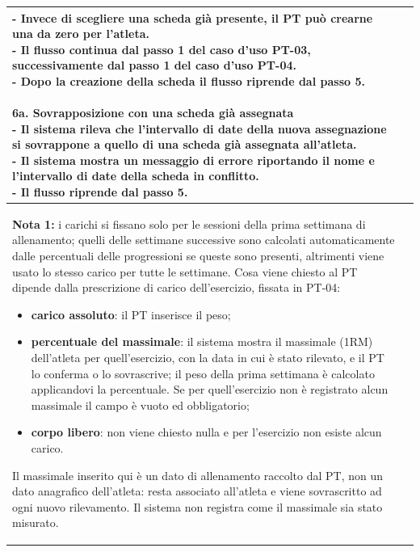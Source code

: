\documentclass[../../../../SoftwareRequirementsSpecification.tex]{subfiles}
\begin{document}
\begin{tabularx}{\textwidth}{|l|X|}
{    - Invece di scegliere una scheda già presente, il PT può crearne
    una da zero per l'atleta. \newline
    - Il flusso continua dal passo 1 del caso d'uso PT-03,
    successivamente dal passo 1 del caso d'uso PT-04. \newline
    - Dopo la creazione della scheda il flusso riprende dal
    passo 5. \newline
    \newline
    \textbf{6a. Sovrapposizione con una scheda già assegnata} \newline
    - Il sistema rileva che l'intervallo di date della nuova
    assegnazione si sovrappone a quello di una scheda già assegnata
    all'atleta. \newline
    - Il sistema mostra un messaggio di errore riportando il nome e
    l'intervallo di date della scheda in conflitto. \newline
    - Il flusso riprende dal passo 5. \newline
  } \\ \hline
  \ucnote{
    \textbf{Nota 1:} i carichi si fissano solo per le sessioni della
    prima settimana di allenamento; quelli delle settimane successive
    sono calcolati automaticamente dalle percentuali delle
    progressioni se queste sono presenti, altrimenti viene usato lo
    stesso carico per tutte le settimane. Cosa viene chiesto al PT
    dipende dalla prescrizione di carico dell'esercizio, fissata in
    PT-04:
    \begin{itemize}
      \item \textbf{carico assoluto}: il PT inserisce il peso;
      \item \textbf{percentuale del massimale}: il sistema mostra il
        massimale (1RM) dell'atleta per quell'esercizio, con la data
        in cui è stato rilevato, e il PT lo conferma o lo
        sovrascrive; il peso della prima settimana è calcolato
        applicandovi la percentuale. Se per quell'esercizio non è
        registrato alcun massimale il campo è vuoto ed
        obbligatorio;
      \item \textbf{corpo libero}: non viene chiesto nulla e per
        l'esercizio non esiste alcun carico.
    \end{itemize}
    Il massimale inserito qui è un dato di allenamento raccolto dal
    PT, non un dato anagrafico dell'atleta: resta associato
    all'atleta e viene sovrascritto ad ogni nuovo rilevamento. Il
    sistema non registra come il massimale sia stato
    misurato.\newline
}
\end{tabularx}
\end{document}

